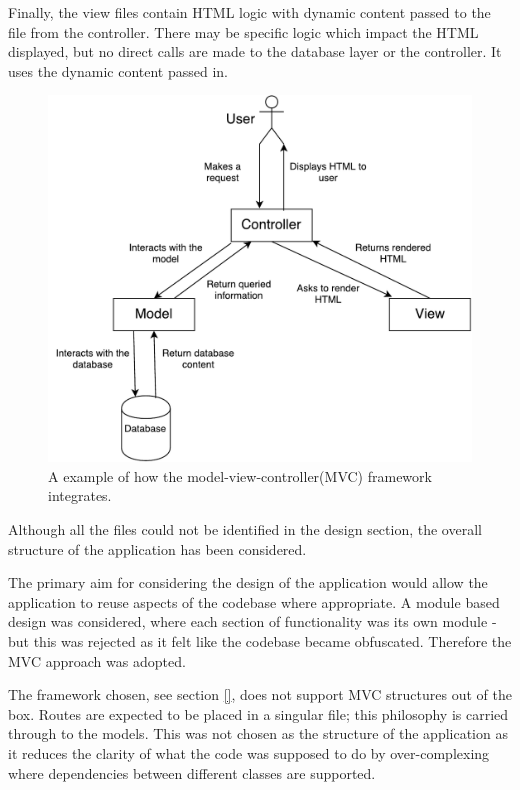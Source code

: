 Finally, the view files contain HTML logic with dynamic content passed to the file from the controller. There may be specific logic which impact the HTML displayed, but no direct calls are made to the database layer or the controller. It uses the dynamic content passed in.

\begin{figure}[h]
  \centering
  \includegraphics[scale=0.5]{images/MVC}
  \caption{A example of how the model-view-controller(MVC) framework integrates.}
  \label{fig:mvc}
\end{figure}

Although all the files could not be identified in the design section, the overall structure of the application has been considered.

The primary aim for considering the design of the application would allow the application to reuse aspects of the codebase where appropriate. A module based design was considered, where each section of functionality was its own module - but this was rejected as it felt like the codebase became obfuscated. Therefore the MVC approach was adopted.

The framework chosen, see section \ref{}, does not support MVC structures out of the box. Routes are expected to be placed in a singular file; this philosophy is carried through to the models. This was not chosen as the structure of the application as it reduces the clarity of what the code was supposed to do by over-complexing where dependencies between different classes are supported.

